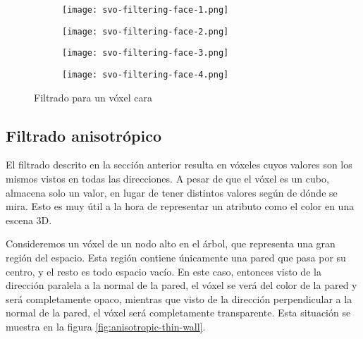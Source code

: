 \begin{figure}
    \begin{center}
        \begin{subfigure}{.24\textwidth}
            \texttt{[image: svo-filtering-face-1.png]}
        \end{subfigure}
        \begin{subfigure}{.24\textwidth}
            \texttt{[image: svo-filtering-face-2.png]}
        \end{subfigure}
        \begin{subfigure}{.24\textwidth}
            \texttt{[image: svo-filtering-face-3.png]}
        \end{subfigure}
        \begin{subfigure}{.24\textwidth}
            \texttt{[image: svo-filtering-face-4.png]}
        \end{subfigure}
    \end{center}
    \caption{Filtrado para un vóxel cara}
    \label{fig:svo_filtering_faces}
\end{figure}


\subsection{Filtrado anisotrópico}

El filtrado descrito en la sección anterior resulta en vóxeles cuyos valores son los mismos vistos en todas las direcciones.
A pesar de que el vóxel es un cubo, almacena solo un valor, en lugar de tener distintos valores según de dónde se mira.
Esto es muy útil a la hora de representar un atributo como el color en una escena 3D.

Consideremos un vóxel de un nodo alto en el árbol, que representa una gran región del espacio.
Esta región contiene únicamente una pared que pasa por su centro, y el resto es todo espacio vacío.
En este caso, entonces visto de la dirección paralela a la normal de la pared, el vóxel se verá del color de la pared y será completamente opaco, mientras que visto de la dirección perpendicular a la normal de la pared, el vóxel será completamente transparente.
Esta situación se muestra en la figura \ref{fig:anisotropic-thin-wall}.

